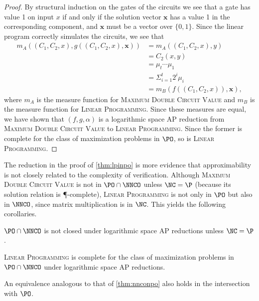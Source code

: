 \begin{proof}
  By structural induction on the gates of the circuits we see that a gate has value 1 on input $x$ if and only if the solution vector $\mathbf{x}$ has a value 1 in the corresponding component, and $\mathbf{x}$ must be a vector over $\{0, 1\}$.
  Since the linear program correctly simulates the circuits, we see that
  \begin{align*}
    m_A((C_1, C_2, x), g((C_1, C_2, x), \mathbf{x})) & = m_A((C_1, C_2, x), y) \\
    & = C_2(x, y) \\
    & = \mu_t \dotsb \mu_1 \\
    & = \Sigma^t_{i = 1} 2^i \mu_i \\
    & = m_B(f((C_1, C_2, x)), \mathbf{x}),
  \end{align*}
  where $m_A$ is the measure function for \textsc{Maximum Double Circuit Value} and $m_B$ is the measure function for \textsc{Linear Programming}.
  Since these measures are equal, we have shown that $(f, g, \alpha)$ is a logarithmic space AP reduction from \textsc{Maximum Double Circuit Value} to \textsc{Linear Programming}.
  Since the former is complete for the class of maximization problems in $\PO$, so is \textsc{Linear Programming}.
\end{proof}

The reduction in the proof of \autoref{thm:lpinpo} is more evidence that approximability is not closely related to the complexity of verification.
Although \textsc{Maximum Double Circuit Value} is not in $\PO \cap \NNCO$ unless $\NC = \P$ (because its solution relation is \P-complete), \textsc{Linear Programming} is not only in $\PO$ but also in $\NNCO$, since matrix multiplication is in $\NC$.
This yields the following corollaries.

\begin{corollary}
  $\PO \cap \NNCO$ is not closed under logarithmic space AP reductions unless $\NC = \P$.
\end{corollary}

\begin{corollary}\label{cor:lpishard}
  \textsc{Linear Programming} is complete for the class of maximization problems in $\PO \cap \NNCO$ under logarithmic space AP reductions.
\end{corollary}

An equivalence analogous to that of \autoref{thm:nnconpo} also holds in the intersection with $\PO$.

